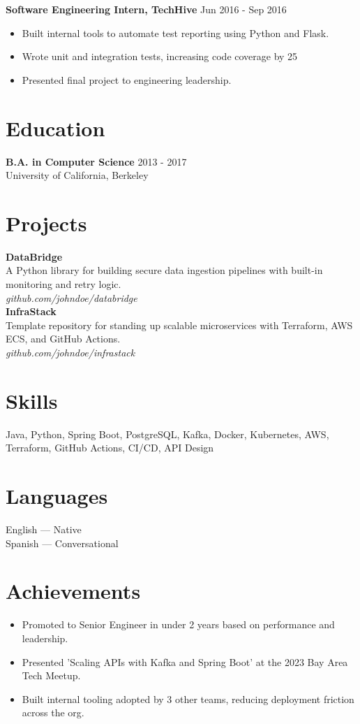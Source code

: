 \documentclass[11pt,a4paper]{article}
\begin{document}
\textbf{Software Engineering Intern, TechHive} \hfill Jun 2016 - Sep 2016 \\
\begin{itemize}[leftmargin=1.5em]
  \item Built internal tools to automate test reporting using Python and Flask.
  \item Wrote unit and integration tests, increasing code coverage by 25%
  \item Presented final project to engineering leadership.
\end{itemize}



\section*{Education}
\textbf{B.A. in Computer Science} \hfill 2013 - 2017 \\
University of California, Berkeley \\



\section*{Projects}
\textbf{DataBridge} \\ 
A Python library for building secure data ingestion pipelines with built-in monitoring and retry logic. \\ 
\textit{github.com/johndoe/databridge} \\

\textbf{InfraStack} \\ 
Template repository for standing up scalable microservices with Terraform, AWS ECS, and GitHub Actions. \\ 
\textit{github.com/johndoe/infrastack} \\



\section*{Skills}
Java, Python, Spring Boot, PostgreSQL, Kafka, Docker, Kubernetes, AWS, Terraform, GitHub Actions, CI/CD, API Design

\section*{Languages}
English — Native \\
Spanish — Conversational \\


\section*{Achievements}
\begin{itemize}[leftmargin=1.5em]
\item Promoted to Senior Engineer in under 2 years based on performance and leadership.
\item Presented 'Scaling APIs with Kafka and Spring Boot' at the 2023 Bay Area Tech Meetup.
\item Built internal tooling adopted by 3 other teams, reducing deployment friction across the org.
\end{itemize}
\end{document}
